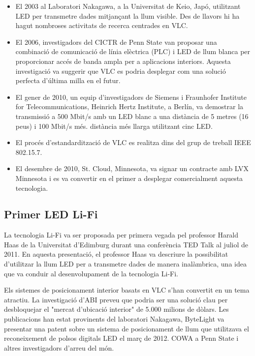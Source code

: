 \begin{itemize}
    \item El 2003 al Laboratori Nakagawa, a la Universitat de Keio, Japó, utilitzant LED per transmetre dades mitjançant la llum visible. Des de llavors hi ha hagut nombroses activitats de recerca centrades en VLC.
    \item El 2006, investigadors del CICTR de Penn State van proposar una combinació de comunicació de línia elèctrica (PLC) i LED de llum blanca per proporcionar accés de banda ampla per a aplicacions interiors. Aquesta investigació va suggerir que VLC es podria desplegar com una solució perfecta d'última milla en el futur.
    \item El gener de 2010, un equip d'investigadors de Siemens i Fraunhofer Institute for Telecommunications, Heinrich Hertz Institute, a Berlín, va demostrar la transmissió a 500 Mbit/s amb un LED blanc a una distància de 5 metres (16 peus) i 100 Mbit/s més. distància més llarga utilitzant cinc LED.
    \item El procés d'estandardització de VLC es realitza dins del grup de treball IEEE 802.15.7.
    \item El desembre de 2010, St. Cloud, Minnesota, va signar un contracte amb LVX Minnesota i es va convertir en el primer a desplegar comercialment aquesta tecnologia.

\end{itemize}


\subsection*{Primer LED Li-Fi}

La tecnologia Li-Fi va ser proposada per primera vegada pel professor Harald Haas de la Universitat d'Edimburg durant una conferència TED Talk al juliol de 2011. En aquesta presentació, el professor Haas va descriure la possibilitat d'utilitzar la llum LED per a transmetre dades de manera inalàmbrica, una idea que va conduir al desenvolupament de la tecnologia Li-Fi.

Els sistemes de posicionament interior basats en VLC s'han convertit en un tema atractiu. La investigació d'ABI preveu que podria ser una solució clau per desbloquejar el "mercat d'ubicació interior" de 5.000 milions de dòlars. Les publicacions han estat provinents del laboratori Nakagawa, ByteLight va presentar una patent sobre un sistema de posicionament de llum que utilitzava el reconeixement de polsos digitals LED el març de 2012. COWA a Penn State i altres investigadors d'arreu del món.


